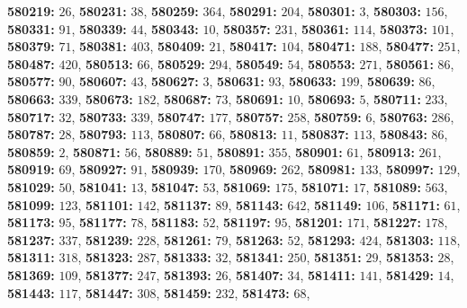 \textsf{\bfseries 580219:} $26$, \textsf{\bfseries 580231:} $38$, \textsf{\bfseries 580259:} $364$, \textsf{\bfseries 580291:} $204$, \textsf{\bfseries 580301:} $3$, \textsf{\bfseries 580303:} $156$, \textsf{\bfseries 580331:} $91$, \textsf{\bfseries 580339:} $44$, \textsf{\bfseries 580343:} $10$, \textsf{\bfseries 580357:} $231$, \textsf{\bfseries 580361:} $114$, \textsf{\bfseries 580373:} $101$, \textsf{\bfseries 580379:} $71$, \textsf{\bfseries 580381:} $403$, \textsf{\bfseries 580409:} $21$, \textsf{\bfseries 580417:} $104$, \textsf{\bfseries 580471:} $188$, \textsf{\bfseries 580477:} $251$, \textsf{\bfseries 580487:} $420$, \textsf{\bfseries 580513:} $66$, \textsf{\bfseries 580529:} $294$, \textsf{\bfseries 580549:} $54$, \textsf{\bfseries 580553:} $271$, \textsf{\bfseries 580561:} $86$, \textsf{\bfseries 580577:} $90$, \textsf{\bfseries 580607:} $43$, \textsf{\bfseries 580627:} $3$, \textsf{\bfseries 580631:} $93$, \textsf{\bfseries 580633:} $199$, \textsf{\bfseries 580639:} $86$, \textsf{\bfseries 580663:} $339$, \textsf{\bfseries 580673:} $182$, \textsf{\bfseries 580687:} $73$, \textsf{\bfseries 580691:} $10$, \textsf{\bfseries 580693:} $5$, \textsf{\bfseries 580711:} $233$, \textsf{\bfseries 580717:} $32$, \textsf{\bfseries 580733:} $339$, \textsf{\bfseries 580747:} $177$, \textsf{\bfseries 580757:} $258$, \textsf{\bfseries 580759:} $6$, \textsf{\bfseries 580763:} $286$, \textsf{\bfseries 580787:} $28$, \textsf{\bfseries 580793:} $113$, \textsf{\bfseries 580807:} $66$, \textsf{\bfseries 580813:} $11$, \textsf{\bfseries 580837:} $113$, \textsf{\bfseries 580843:} $86$, \textsf{\bfseries 580859:} $2$, \textsf{\bfseries 580871:} $56$, \textsf{\bfseries 580889:} $51$, \textsf{\bfseries 580891:} $355$, \textsf{\bfseries 580901:} $61$, \textsf{\bfseries 580913:} $261$, \textsf{\bfseries 580919:} $69$, \textsf{\bfseries 580927:} $91$, \textsf{\bfseries 580939:} $170$, \textsf{\bfseries 580969:} $262$, \textsf{\bfseries 580981:} $133$, \textsf{\bfseries 580997:} $129$, \textsf{\bfseries 581029:} $50$, \textsf{\bfseries 581041:} $13$, \textsf{\bfseries 581047:} $53$, \textsf{\bfseries 581069:} $175$, \textsf{\bfseries 581071:} $17$, \textsf{\bfseries 581089:} $563$, \textsf{\bfseries 581099:} $123$, \textsf{\bfseries 581101:} $142$, \textsf{\bfseries 581137:} $89$, \textsf{\bfseries 581143:} $642$, \textsf{\bfseries 581149:} $106$, \textsf{\bfseries 581171:} $61$, \textsf{\bfseries 581173:} $95$, \textsf{\bfseries 581177:} $78$, \textsf{\bfseries 581183:} $52$, \textsf{\bfseries 581197:} $95$, \textsf{\bfseries 581201:} $171$, \textsf{\bfseries 581227:} $178$, \textsf{\bfseries 581237:} $337$, \textsf{\bfseries 581239:} $228$, \textsf{\bfseries 581261:} $79$, \textsf{\bfseries 581263:} $52$, \textsf{\bfseries 581293:} $424$, \textsf{\bfseries 581303:} $118$, \textsf{\bfseries 581311:} $318$, \textsf{\bfseries 581323:} $287$, \textsf{\bfseries 581333:} $32$, \textsf{\bfseries 581341:} $250$, \textsf{\bfseries 581351:} $29$, \textsf{\bfseries 581353:} $28$, \textsf{\bfseries 581369:} $109$, \textsf{\bfseries 581377:} $247$, \textsf{\bfseries 581393:} $26$, \textsf{\bfseries 581407:} $34$, \textsf{\bfseries 581411:} $141$, \textsf{\bfseries 581429:} $14$, \textsf{\bfseries 581443:} $117$, \textsf{\bfseries 581447:} $308$, \textsf{\bfseries 581459:} $232$, \textsf{\bfseries 581473:} $68$, 
